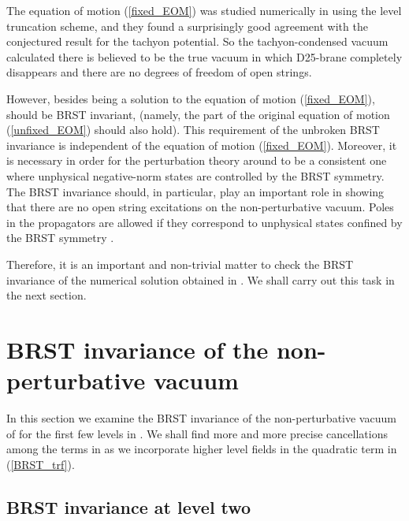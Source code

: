 \documentclass[a4paper,12pt]{article}
\begin{document}
The equation of motion (\ref{fixed_EOM}) was studied numerically in
\cite{SZ,Moeller:2000xv} using the level truncation scheme, and they
found a surprisingly good agreement with the conjectured result
\cite{Sen:1999mh} for the tachyon potential.  So the tachyon-condensed
vacuum \coordHE{} calculated there is believed to be the
true vacuum in which D25-brane completely disappears and there are no
degrees of freedom of open strings.

However, besides being a solution to the equation of motion
(\ref{fixed_EOM}), \coordHE{} should be BRST invariant,
\coordHE{} (namely, the \coordHE{} part of the
original equation of motion (\ref{unfixed_EOM}) should also hold).
This requirement of the unbroken BRST invariance is independent of the
equation of motion (\ref{fixed_EOM}).
Moreover, it is necessary in order for the
perturbation theory around \coordHE{} to be a consistent
one where unphysical negative-norm states are controlled by the BRST
symmetry. The BRST invariance should, in particular, play an important
role in showing
that there are no open string excitations on the non-perturbative
vacuum. Poles in the propagators are allowed if they correspond to
unphysical states confined by the BRST symmetry \cite{Kugo:1979gm}.

Therefore, it is an important and non-trivial matter to check the BRST
invariance of the numerical solution obtained in
\cite{SZ,Moeller:2000xv}. We shall carry out this task in the next
section.


\section{BRST invariance of the non-perturbative vacuum}
\label{sec:BRST-inv}

In this section we examine the BRST invariance of the
non-perturbative vacuum of \cite{Moeller:2000xv} for the first few
levels in \coordHE{}.
We shall find more and more precise cancellations among the terms in
\coordHE{} as we incorporate higher level fields in
the quadratic term in (\ref{BRST_trf}).

\subsection{BRST invariance at level two}
\label{sec:c-2}
\end{document}
